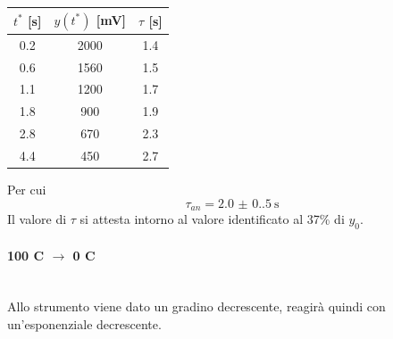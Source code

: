 \documentclass[a4paper, 12pt, twoside]{report}
\newcommand{\ra}[1]{\renewcommand{\arraystretch}{#1}} %
\begin{document}
		\begin{table}[H]
			\centering
			\ra{1.3}
			\begin{tabular}{ccc}
				\toprule
				$t^*$ [\si{\second}] & $y(t^*)$ [\si{\milli\volt}] & $\tau$ [\si{\second}] \\ \midrule
				0.2                                                     & 2000                                                       & 1.4                                                      \\
				0.6                                                     & 1560                                                       & 1.5                                                      \\
				1.1                                                     & 1200                                                       & 1.7                                                      \\
				1.8                                                     & 900                                                        & 1.9                                                      \\
				2.8                                                     & 670                                                        & 2.3                                                      \\
				4.4                                                     & 450                                                        & 2.7                                                      \\ \bottomrule
			\end{tabular}
		\end{table}		
		Per cui
		\[\tau_{an} = \SI[separate-uncertainty = true]{2.0(0.5)}{\second} \]			
		Il valore di $\tau$ si attesta intorno al valore identificato al 37\% di $y_0$. 
\newpage	
		\paragraph{100 \degree C $\rightarrow$ 0 \degree C}	\mbox{}\\
		Allo strumento viene dato un gradino decrescente, reagirà quindi con un'esponenziale decrescente. \newline
		
\end{document}
